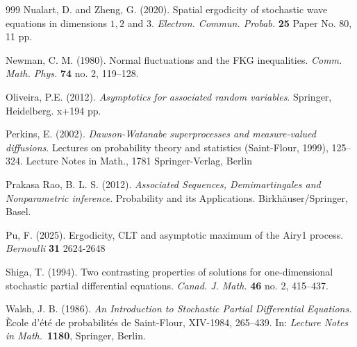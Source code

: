 \documentclass[12pt, reqno]{amsart}
\newcommand{\<}{\langle}
\renewcommand{\>}{\rangle}
\begin{document}
\begin{thebibliography}{999}
Nualart, D. and Zheng, G. (2020).
Spatial ergodicity of stochastic wave equations in dimensions $1, 2$ and $3$.
{\it Electron. Commun. Probab.} {\bf 25} Paper No. 80, 11 pp.

Newman, C. M. (1980).
Normal fluctuations and the FKG inequalities.
{\it Comm. Math. Phys.} {\bf 74}  no. 2, 119–128.


Oliveira, P.E. (2012).
{\it Asymptotics for associated random variables}.
Springer, Heidelberg. x+194 pp.


Perkins, E. (2002).
{\it Dawson-Watanabe superprocesses and measure-valued diffusions}. Lectures on probability theory and statistics (Saint-Flour, 1999), 125–324.
Lecture Notes in Math., 1781
Springer-Verlag, Berlin

Prakasa Rao, B. L. S. (2012).
{\it Associated Sequences, Demimartingales and Nonparametric inference}.
Probability and its Applications. Birkh\"auser/Springer, Basel.


Pu, F. (2025). Ergodicity, CLT and asymptotic maximum of the Airy1 process. 
{\it Bernoulli} {\bf 31}  2624-2648


Shiga, T. (1994).
Two contrasting properties of solutions for one-dimensional stochastic partial differential equations.
{\it Canad. J. Math.} {\bf 46} no. 2, 415–437.


	Walsh, J. B. (1986).
	{\it An Introduction to Stochastic Partial Differential Equations.}
	\`Ecole d'\'et\'e de probabilit\'es de Saint-Flour, XIV-1984, 265--439.
	In: {\it Lecture Notes in Math.}\ {\bf 1180}, Springer, Berlin.

 \end{thebibliography}
 
 
 
 
 
 
 

 
 
 
 
 
 
 
\end{document}
